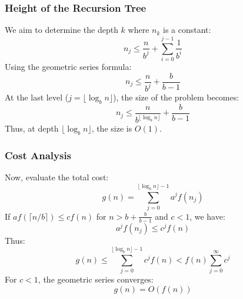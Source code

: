 \subsubsection{Height of the Recursion Tree}
We aim to determine the depth \(k\) where \(n_k\) is a constant:
\[
n_j \leq \frac{n}{b^j} + \sum_{i=0}^{j-1} \frac{1}{b^i}
\]
Using the geometric series formula:
\[
n_j \leq \frac{n}{b^j} + \frac{b}{b-1}
\]
At the last level (\(j = \lfloor \log_b n \rfloor\)), the size of the problem becomes:
\[
n_{j} \leq \frac{n}{b^{\lfloor \log_b n \rfloor}} + \frac{b}{b-1}
\]
Thus, at depth \(\lfloor \log_b n \rfloor\), the size is \(O(1)\).

\subsubsection{Cost Analysis}
Now, evaluate the total cost:
\[
g(n) = \sum_{j=0}^{\lfloor \log_b n \rfloor - 1} a^j f(n_j)
\]
If \(a f(\lceil n/b \rceil) \leq c f(n)\) for \(n > b + \frac{b}{b-1}\) and \(c < 1\), we have:
\[
a^j f(n_j) \leq c^j f(n)
\]
Thus:
\[
g(n) \leq \sum_{j=0}^{\lfloor \log_b n \rfloor - 1} c^j f(n) < f(n) \sum_{j=0}^{\infty} c^j
\]
For \(c < 1\), the geometric series converges:
\[
g(n) = O(f(n))
\]


